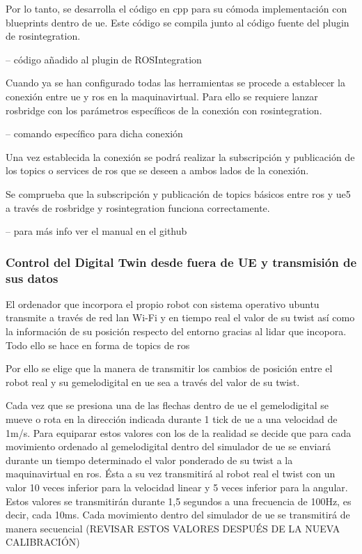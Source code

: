 \documentclass[a4paper, 12pt, spanish, twoside]{article}
\begin{document}
Por lo tanto, se desarrolla el código en \gls{cpp} para su cómoda implementación con \glspl{blueprint} dentro de \acrshort{ue}. Este código se compila junto al código fuente del \gls{plugin} de \gls{rosintegration}. 

-- código añadido al plugin de ROSIntegration 

Cuando ya se han configurado todas las herramientas se procede a establecer la conexión entre \acrshort{ue} y \acrshort{ros} en la \gls{maquinavirtual}. Para ello se requiere lanzar \gls{rosbridge} con los parámetros específicos de la conexión con \gls{rosintegration}.  

-- comando específico para dicha conexión 

Una vez establecida la conexión se podrá realizar la subscripción y publicación de los \glspl{topic} o \glspl{service} de \acrshort{ros} que se deseen a ambos lados de la conexión. 

Se comprueba que la subscripción y publicación de \glspl{topic} básicos entre \acrshort{ros} y \acrshort{ue}5 a través de \gls{rosbridge} y \gls{rosintegration} funciona correctamente. 

-- para más info ver el manual en el github 

\subsubsection{Control del Digital Twin desde fuera de UE y transmisión de sus datos} \label{sec:implementacion:nerfstudio-volinga:control}

El ordenador que incorpora el propio robot con sistema operativo \gls{ubuntu} transmite a través de red \acrshort{lan} Wi-Fi y en tiempo real el valor de su \gls{twist} así como la información de su posición respecto del entorno gracias al \acrshort{lidar} que incopora. Todo ello se hace en forma de \glspl{topic} de \acrshort{ros} 

Por ello se elige que la manera de transmitir los cambios de posición entre el robot real y su \gls{gemelodigital} en \acrshort{ue} sea a través del valor de su \gls{twist}. 

Cada vez que se presiona una de las flechas dentro de \acrshort{ue} el \gls{gemelodigital} se mueve o rota en la dirección indicada durante 1 \gls{tick} de \acrshort{ue} a una velocidad de 1m/s. Para equiparar estos valores con los de la realidad se decide que para cada movimiento ordenado al \gls{gemelodigital} dentro del simulador de \acrshort{ue} se enviará durante un tiempo determinado el valor ponderado de su \gls{twist} a la \gls{maquinavirtual} en \acrshort{ros}. Ésta a su vez transmitirá al robot real el \gls{twist} con un valor 10 veces inferior para la velocidad linear y 5 veces inferior para la angular. Estos valores se transmitirán durante 1,5 segundos a una frecuencia de 100Hz, es decir, cada 10ms. Cada movimiento dentro del simulador de \acrshort{ue} se transmitirá de manera secuencial (REVISAR ESTOS VALORES DESPUÉS DE LA NUEVA CALIBRACIÓN) 
\end{document}
